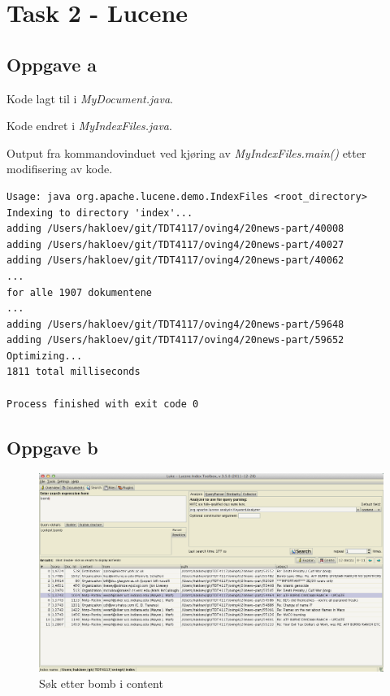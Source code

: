 \lstset{language=Java,
numberstyle=\footnotesize,
basicstyle=\ttfamily\footnotesize,
frame=shadowbox,
breaklines=true}

\section*{Task 2 - Lucene}

\subsection*{Oppgave a}

Kode lagt til i \textit{MyDocument.java}.


\noindent Kode endret i \textit{MyIndexFiles.java}.


\noindent Output fra kommandovinduet ved kjøring av \textit{MyIndexFiles.main()} etter modifisering av kode.
\begin{lstlisting}[frame=single]
Usage: java org.apache.lucene.demo.IndexFiles <root_directory>
Indexing to directory 'index'...
adding /Users/hakloev/git/TDT4117/oving4/20news-part/40008
adding /Users/hakloev/git/TDT4117/oving4/20news-part/40027
adding /Users/hakloev/git/TDT4117/oving4/20news-part/40062
... 
for alle 1907 dokumentene
...
adding /Users/hakloev/git/TDT4117/oving4/20news-part/59648
adding /Users/hakloev/git/TDT4117/oving4/20news-part/59652
Optimizing...
1811 total milliseconds

Process finished with exit code 0
\end{lstlisting}

\newpage
\subsection*{Oppgave b}

\begin{figure}[p]
\centering
\includegraphics[scale=0.31]{images/bombcontent.png}
\caption{Søk etter bomb i content}
\end{figure}

